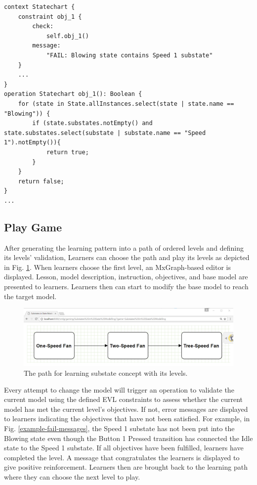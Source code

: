 \documentclass[conference]{IEEEtran}
\begin{document}
\begin{lstlisting}[caption={Validation realisation for Objective 1 in One-Speed Fan activity/level.}, label=validation-realisation]
context Statechart {
    constraint obj_1 {
        check: 
            self.obj_1()
        message:
            "FAIL: Blowing state contains Speed 1 substate"
    }
    ...
}
operation Statechart obj_1(): Boolean {
    for (state in State.allInstances.select(state | state.name == "Blowing")) {
        if (state.substates.notEmpty() and state.substates.select(substate | substate.name == "Speed 1").notEmpty()){
            return true;
        }        
    }
    return false;
}
...
\end{lstlisting} 

\subsection{Play Game}
After generating the learning pattern into a path of ordered levels and defining its levels' validation, Learners can choose the path and play its levels as depicted in Fig. \ref{path}. When learners choose the first level, an MxGraph-based editor is displayed. Lesson, model description, instruction, objectives, and base model are presented to learners. Learners then can start to modify the base model to reach the target model. 

\begin{figure}[th]
\centering
\includegraphics[width=\linewidth]{path}
\caption{The path for learning substate concept with its levels.}
\label{path}
\end{figure}    

Every attempt to change the model will trigger an operation to validate the current model using the defined EVL constraints to assess whether the current model has met the current level's objectives. If not, error messages are displayed to learners indicating the objectives that have not been satisfied. For example, in Fig. \ref{example-fail-messages}, the Speed 1 substate has not been put into the Blowing state even though the Button 1 Pressed transition has connected the Idle state to the Speed 1 substate. If all objectives have been fulfilled, learners have completed the level. A message that congratulates the learners is displayed to give positive reinforcement. Learners then are brought back to the learning path where they can choose the next level to play.  
\end{document}
